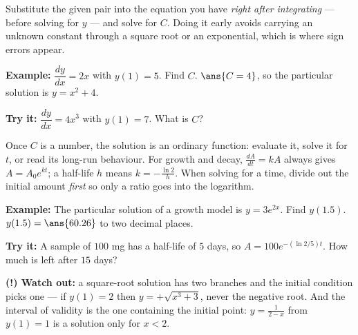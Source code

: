 \documentclass[12pt]{article}
\begin{document}
\begin{formulabox}
Substitute the given pair into the equation you have \emph{right after
integrating} --- before solving for $y$ --- and solve for $C$. Doing it early
avoids carrying an unknown constant through a square root or an exponential,
which is where sign errors appear.
\end{formulabox}

\begin{examplebox}
\textbf{Example:} $\dfrac{dy}{dx} = 2x$ with $y(1) = 5$. Find $C$.
$\ans{C = 4}$, so the particular solution is $y = x^2 + 4$.
\end{examplebox}

\begin{tryitbox}
\textbf{Try it:} $\dfrac{dy}{dx} = 4x^3$ with $y(1) = 7$. What is $C$?\\[2pt]
\end{tryitbox}


\begin{formulabox}
Once $C$ is a number, the solution is an ordinary function: evaluate it,
solve it for $t$, or read its long-run behaviour. For growth and decay,
$\frac{dA}{dt} = kA$ always gives $A = A_0e^{kt}$; a half-life $h$ means
$k = -\frac{\ln 2}{h}$. When solving for a time, divide out the initial amount
\emph{first} so only a ratio goes into the logarithm.
\end{formulabox}

\begin{examplebox}
\textbf{Example:} The particular solution of a growth model is
$y = 3e^{2x}$. Find $y(1.5)$.
$y(1.5) = \ans{60.26}$ to two decimal places.
\end{examplebox}

\begin{tryitbox}
\textbf{Try it:} A sample of $100$ mg has a half-life of $5$ days, so
$A = 100e^{-(\ln 2/5)t}$. How much is left after $15$ days?\\[2pt]
\end{tryitbox}

\begin{watchoutbox}
\textbf{(!) Watch out:} a square-root solution has two branches and the initial
condition picks one --- if $y(1) = 2$ then $y = +\sqrt{x^3+3}$, never the
negative root. And the interval of validity is the one containing the initial
point: $y = \frac{1}{2-x}$ from $y(1) = 1$ is a solution only for $x < 2$.
\end{watchoutbox}
\end{document}
